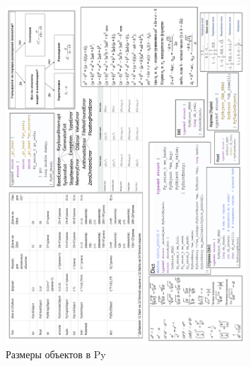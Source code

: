 \begin{figure}[h!]
\centering
\includegraphics[width=0.8\textwidth]{img/py_data_size.png}
\caption{Размеры объектов в Py}
\label{unicast}
\end{figure}